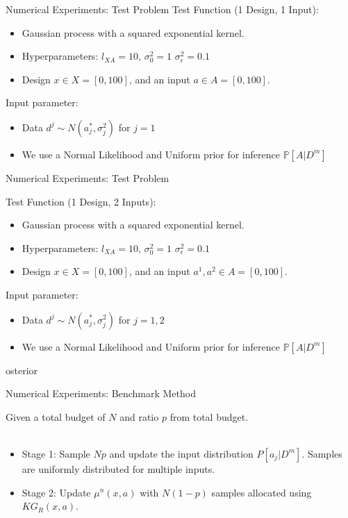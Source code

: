 \documentclass{beamer}
\begin{document}
\begin{frame}{Numerical Experiments: Test Problem}
Test Function (1 Design, 1 Input): 
\begin{itemize}
	\item Gaussian process with a squared exponential kernel.
	\item Hyperparameters: $l_{XA} = 10$, $\sigma_{0}^{2}=1$ $\sigma_{\epsilon}^{2}=0.1$
	\item Design $x \in X = [0, 100]$, and an input $a \in A = [0, 100]$.
\end{itemize}
Input parameter:
\begin{itemize}osterior 
	\item Data $d^{j} \sim N(a_{j}^{*},\sigma_{j}^{2})$ for $j=1$
	\item We use a Normal Likelihood and Uniform prior for inference $\mathbb{P}[A|D^{m}]$ 
\end{itemize}
\end{frame}
\begin{frame}{Numerical Experiments: Test Problem}

Test Function (1 Design, 2 Inputs): 
\begin{itemize}
	\item Gaussian process with a squared exponential kernel.
	\item Hyperparameters: $l_{XA} = 10$, $\sigma_{0}^{2}=1$ $\sigma_{\epsilon}^{2}=0.1$
	\item Design $x \in X = [0, 100]$, and an input $a^{1},a^{2} \in A = [0, 100]$.
\end{itemize}
Input parameter:
\begin{itemize}
	\item Data $d^{j} \sim N(a_{j}^{*},\sigma_{j}^{2})$ for $j=1,2$
	\item We use a Normal Likelihood and Uniform prior for inference $\mathbb{P}[A|D^{m}]$ 
\end{itemize}
\end{frame}osterior 

\begin{frame}{Numerical Experiments: Benchmark Method}

Given a total budget of $N$ and ratio $p$ from total budget.\\~\\

\begin{itemize}
	\item Stage 1: Sample $Np$ and update the input distribution $P[a_{j}|D^{m}]$. Samples are uniformly distributed for multiple inputs.
	\item Stage 2: Update $\mu ^{n}(x,a)$ with $N(1-p)$ samples allocated using $KG_{R}(x,a)$.
\end{itemize}
\end{frame}
\end{document}
